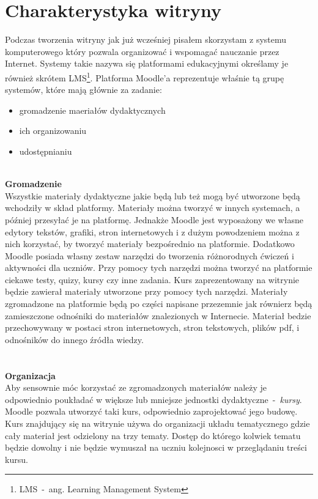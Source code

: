 \section{Charakterystyka witryny} \label{roz:charakterystyka}
\hspace{1cm} Podczas tworzenia witryny jak już wcześniej pisałem skorzystam z systemu komputerowego który pozwala organizować i wspomagać nauczanie przez Internet. Systemy takie nazywa się platformami edukacyjnymi określamy je również skrótem LMS\footnote{LMS~-~ang. Learning Management System}. Platforma Moodle'a reprezentuje właśnie tą grupę systemów, które mają głównie za zadanie: \\
	\begin{itemize}
		\item gromadzenie maeriałów dydaktycznych
		\item ich organizowaniu
		\item udostępnianiu 
	\end{itemize}
\ \\
\textbf{Gromadzenie} \\
Wszystkie materiały dydaktyczne jakie będą lub też mogą być utworzone będą wchodziły w skład platformy. Materiały można tworzyć w innych systemach, a później przesyłać je na platformę. Jednakże Moodle jest wyposażony we własne edytory tekstów, grafiki, stron internetowych i z dużym powodzeniem można z nich korzystać, by tworzyć materiały bezpośrednio na platformie. Dodatkowo Moodle posiada własny zestaw narzędzi do tworzenia różnorodnych ćwiczeń i aktywności dla uczniów. Przy pomocy tych narzędzi można tworzyć na platformie ciekawe testy, quizy, kursy czy inne zadania. Kurs zaprezentowany na witrynie będzie zawierał materiały utworzone przy pomocy tych narzędzi. Materiały zgromadzone na platformie będą po części napisane przezemnie jak równierz będą zamieszczone odnośniki do materiałów znalezionych w Internecie. Materiał bedzie przechowywany w postaci stron internetowych, stron tekstowych, plików pdf, i odnośników do innego źródła wiedzy. \\
\\
\newpage
\ \\
\textbf{Organizacja} \\
Aby sensownie móc korzystać ze zgromadzonych materiałów należy je odpowiednio poukładać w większe lub mniejsze jednostki dydaktyczne~-~\textit{kursy}. Moodle pozwala utworzyć taki kurs, odpowiednio zaprojektować jego budowę. Kurs znajdujący się na witrynie używa do organizacji układu tematycznego gdzie cały materiał jest odzielony na trzy tematy. Dostęp do którego kolwiek tematu będzie dowolny i nie będzie wymuszał na uczniu kolejnosci w przeglądaniu treści kursu.\\
